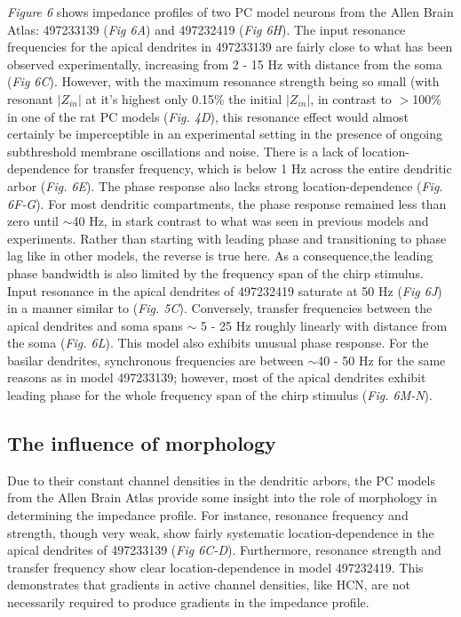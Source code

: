 \documentclass[utf8]{frontiersSCNS} %
\begin{document}
\emph{Figure 6} shows impedance profiles of two PC model neurons from the Allen Brain
Atlas: 497233139 (\emph{Fig 6A}) and 497232419 (\emph{Fig 6H}).
The input resonance frequencies for the apical dendrites in 497233139 are fairly close
to what has been observed experimentally, increasing from 2 - 15 Hz with
distance from the soma (\emph{Fig 6C}).
However, with the maximum resonance strength being so small
(with resonant $|Z_{in}|$ at it's highest only 0.15\% the initial $|Z_{in}|$, in contrast to $>$100\% in one of the rat PC models (\emph{Fig. 4D}), 
this resonance effect would almost certainly be imperceptible in an experimental setting in the presence of ongoing subthreshold membrane oscillations and noise.
There is a lack of location-dependence for transfer frequency, which is below 1 Hz across the entire dendritic arbor (\emph{Fig. 6E}).
The phase response also lacks strong location-dependence (\emph{Fig. 6F-G}). For most dendritic compartments, the phase response remained less than zero until $\sim$40 Hz, 
in stark contrast to what was seen in previous models and experiments. Rather than starting with leading phase and transitioning to phase lag like in
other models, the reverse is true here.  As a consequence,the leading phase bandwidth is also limited by the frequency span of the chirp stimulus.
Input resonance in the apical dendrites of 497232419 saturate at 50 Hz (\emph{Fig 6J}) in a manner similar to \cite{Neymotin2017-dr} (\emph{Fig. 5C}).  
Conversely, transfer frequencies between the apical dendrites and soma spans $\sim$ 5 - 25 Hz roughly linearly with distance from the soma (\emph{Fig. 6L}).
This model also exhibits unusual phase response.  For the basilar dendrites, synchronous frequencies are between $\sim$40 - 50 Hz for the same reasons as in model 497233139;
however, most of the apical dendrites exhibit leading phase for the whole frequency span of the chirp stimulus (\emph{Fig. 6M-N}).
\\
\subsection{The influence of morphology}
Due to their constant channel densities in the dendritic arbors, the PC models from the Allen Brain Atlas provide some insight into the role of morphology 
in determining the impedance profile. 
For instance, resonance frequency and strength, though very weak, show fairly systematic location-dependence in the apical dendrites of 497233139 (\emph{Fig 6C-D}). 
Furthermore, resonance strength and transfer frequency show clear location-dependence in model 497232419.
This demonstrates that gradients in active channel densities, like HCN, are not necessarily required to produce gradients in the impedance profile.
\end{document}
